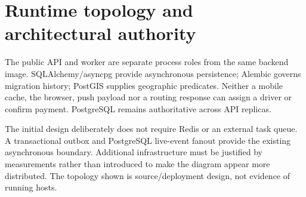 \documentclass[11pt,a4paper]{article}
\begin{document}
\section{Runtime topology and architectural authority}
\begin{center}
\end{center}

The public API and worker are separate process roles from the same backend
image. SQLAlchemy/asyncpg provide asynchronous persistence; Alembic governs
migration history; PostGIS supplies geographic predicates. Neither a mobile
cache, the browser, push payload nor a routing response can assign a driver or
confirm payment. PostgreSQL remains authoritative across API replicas.

The initial design deliberately does not require Redis or an external task
queue. A transactional outbox and PostgreSQL live-event fanout provide the
existing asynchronous boundary. Additional infrastructure must be justified by
measurements rather than introduced to make the diagram appear more distributed.
The topology shown is source/deployment design, not evidence of running hosts.
\end{document}
